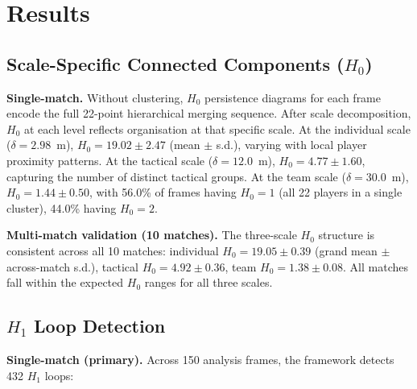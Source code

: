 \section{Results}
\label{sec:results}

\subsection{Scale-Specific Connected Components (\texorpdfstring{$H_0$}{H0})}
\label{sec:scale_h0}

\textbf{Single-match.} Without clustering, \(H_0\) persistence diagrams for each frame encode the full 22-point hierarchical merging sequence. After scale decomposition, \(H_0\) at each level reflects organisation at that specific scale. At the individual scale (\(\delta=2.98\)~m), \(H_0=19.02\pm2.47\) (mean \(\pm\) s.d.), varying with local player proximity patterns. At the tactical scale (\(\delta=12.0\)~m), \(H_0=4.77\pm1.60\), capturing the number of distinct tactical groups. At the team scale (\(\delta=30.0\)~m), \(H_0=1.44\pm0.50\), with 56.0\% of frames having \(H_0=1\) (all 22 players in a single cluster), 44.0\% having \(H_0=2\).

\textbf{Multi-match validation (10 matches).} The three-scale \(H_0\) structure is consistent across all 10 matches: individual \(H_0=19.05\pm0.39\) (grand mean \(\pm\) across-match s.d.), tactical \(H_0=4.92\pm0.36\), team \(H_0=1.38\pm0.08\). All matches fall within the expected \(H_0\) ranges for all three scales.

\subsection{\texorpdfstring{$H_1$}{H1} Loop Detection}

\textbf{Single-match (primary).} Across 150 analysis frames, the framework detects 432 \(H_1\) loops:

\begin{table}[H]
  \centering
  \caption{Single-match \texorpdfstring{$H_1$}{H1} statistics (primary match, 150 frames).}
  \label{tab:h1single}
\end{table}

